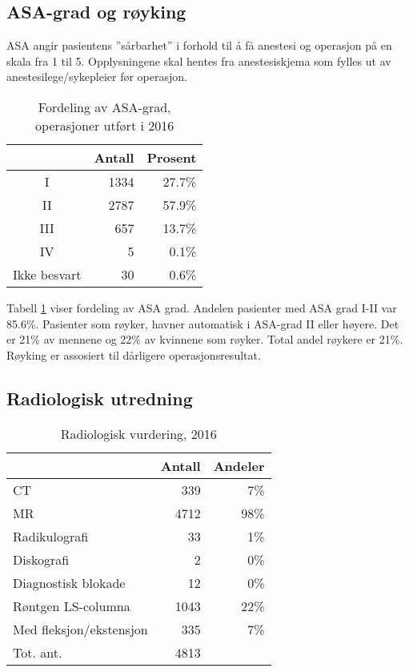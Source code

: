 \clearpage



\subsection{ASA-grad og røyking}
ASA angir pasientens ”sårbarhet” i forhold til å få anestesi og operasjon på en skala fra 1 til 5. 
Opplysningene skal hentes fra anestesiskjema som fylles ut av anestesilege/sykepleier før operasjon.
\begin{table}[ht]
\centering
\begin{tabular}{crr}
  \hline
 & Antall & Prosent \\ 
  \hline
I & 1334 & 27.7\% \\ 
  II & 2787 & 57.9\% \\ 
  III & 657 & 13.7\% \\ 
  IV & 5 & 0.1\% \\ 
  Ikke besvart & 30 & 0.6\% \\ 
   \hline
\end{tabular}
\caption{Fordeling av ASA-grad, operasjoner utført i 2016} 
\label{tab:ASA}
\end{table}


Tabell \ref{tab:ASA} viser fordeling av ASA grad. Andelen pasienter med ASA grad I-II 
var 85.6\%. Pasienter som røyker, havner automatisk i ASA-grad II eller høyere. 
Det er 21\% av mennene og 22\% av kvinnene som røyker. 
                    Total andel røykere er 21\%. Røyking er assosiert til dårligere operasjonsresultat.



\subsection{Radiologisk utredning}

\begin{table}[ht]
\centering
\begin{tabular}{lrr}
  \hline
 & Antall & Andeler \\ 
  \hline
CT & 339 & 7\% \\ 
  MR & 4712 & 98\% \\ 
  Radikulografi & 33 & 1\% \\ 
  Diskografi & 2 & 0\% \\ 
  Diagnostisk blokade & 12 & 0\% \\ 
  Røntgen LS-columna & 1043 & 22\% \\ 
  Med fleksjon/ekstensjon & 335 & 7\% \\ 
  Tot. ant. & 4813 &   \\ 
   \hline
\end{tabular}
\caption{Radiologisk vurdering, 2016} 
\label{tab:RV}
\end{table}


